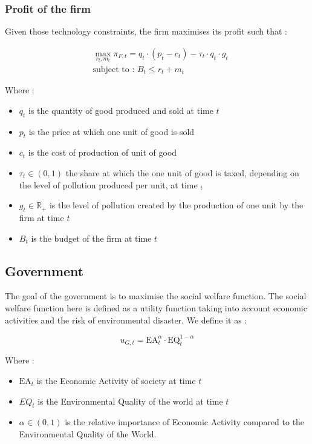 \documentclass{article}
\begin{document}
\subsubsection{Profit of the firm}

Given those technology constraints, the firm maximises its profit such that : 

\begin{equation}
    \begin{split}
        &\max_{r_{t},m_{t}}{\pi_{F,t}=q_{t}\cdot\left(p_{t}-c_{t}\right)-\tau_{t}\cdot q_{t}\cdot g_{t}} \\
        &\text{subject to : } B_{t} \leq r_{t} + m_{t}
    \end{split}
\end{equation}

Where : 
\begin{itemize}
    \item $q_{t}$ is the quantity of good produced and sold at time $t$
    \item $p_{t}$ is the price at which one unit of good is sold
    \item $c_{t}$ is the cost of production of unit of good
    \item $\tau_{t}\in\left(0,1\right)$ the share at which the one unit of good is taxed, depending on the level of pollution produced per unit, at time $_{t}$
    \item $g_{t}\in\mathbb{R}_{+}$ is the level of pollution created by the production of one unit by the firm at time $t$
    \item $B_{t}$ is the budget of the firm at time $t$
\end{itemize}

\subsection{Government}

The goal of the government is to maximise the social welfare function. The social welfare function here is defined as a utility function taking into account economic activities and the risk of environmental disaster. We define it as : 

\begin{equation}
    u_{G,t}=\text{EA}_{t}^{\alpha}\cdot\text{EQ}_{t}^{1-\alpha}
\end{equation}

Where : 
\begin{itemize}
    \item $\text{EA}_{t}$ is the Economic Activity of society at time $t$
    \item $EQ_{t}$ is the Environmental Quality of the world at time $t$
    \item $\alpha \in \left(0,1\right)$ is the relative importance of Economic Activity compared to the Environmental Quality of the World.
\end{itemize}
\end{document}
